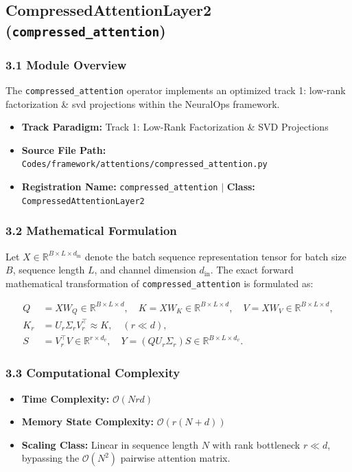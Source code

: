 \subsection{CompressedAttentionLayer2 (\texttt{compressed\_attention})}
\label{sec:app_module_compressed\_attention}

\subsubsection*{3.1 Module Overview}
The \texttt{compressed\_attention} operator implements an optimized track 1: low-rank factorization \& svd projections within the NeuralOps framework.
\begin{itemize}
    \item \textbf{Track Paradigm:} Track 1: Low-Rank Factorization & SVD Projections
    \item \textbf{Source File Path:} \texttt{Codes/framework/attentions/compressed\_attention.py}
    \item \textbf{Registration Name:} \texttt{compressed\_attention} $\mid$ \textbf{Class:} \texttt{CompressedAttentionLayer2}
\end{itemize}

\subsubsection*{3.2 Mathematical Formulation}
Let $X \in \mathbb{R}^{B \times L \times d_{\text{in}}}$ denote the batch sequence representation tensor for batch size $B$, sequence length $L$, and channel dimension $d_{\text{in}}$. The exact forward mathematical transformation of \texttt{compressed\_attention} is formulated as:

\begin{align}
Q &= X W_Q \in \mathbb{R}^{B \times L \times d}, \quad K = X W_K \in \mathbb{R}^{B \times L \times d}, \quad V = X W_V \in \mathbb{R}^{B \times L \times d}, \\
K_r &= U_r \Sigma_r V_r^\top \approx K, \quad (r \ll d), \\
S &= V_r^\top V \in \mathbb{R}^{r \times d_v}, \quad Y = (Q U_r \Sigma_r) S \in \mathbb{R}^{B \times L \times d_v}.
\end{align}


\subsubsection*{3.3 Computational Complexity}
\begin{itemize}
    \item \textbf{Time Complexity:} $\mathcal{O}(N r d)$
    \item \textbf{Memory State Complexity:} $\mathcal{O}(r(N + d))$
    \item \textbf{Scaling Class:} Linear in sequence length $N$ with rank bottleneck $r \ll d$, bypassing the $\mathcal{O}(N^2)$ pairwise attention matrix.
\end{itemize}


